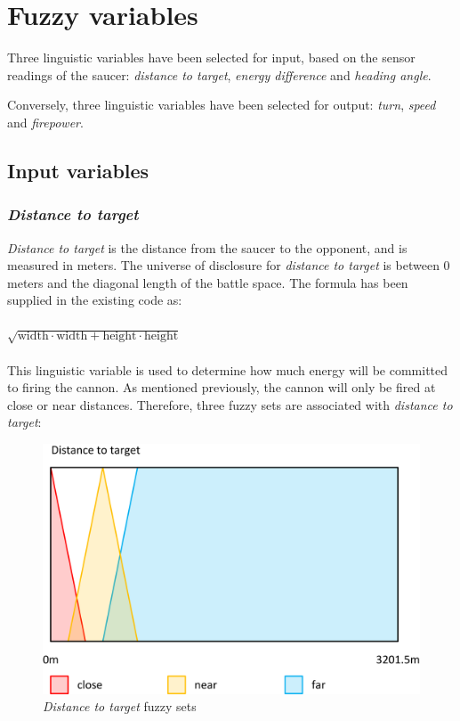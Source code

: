\newpage

\section{Fuzzy variables}

Three linguistic variables have been selected for input, based on the sensor readings of the saucer: \emph{distance to target}, \emph{energy difference} and \emph{heading angle}.

Conversely, three linguistic variables have been selected for output: \emph{turn}, \emph{speed} and \emph{firepower}.

\subsection{Input variables}

\subsubsection{\emph{Distance to target}}

\emph{Distance to target} is the distance from the saucer to the opponent, and is measured in meters. The universe of disclosure for \emph{distance to target} is between 0 meters and the diagonal length of the battle space. The formula has been supplied in the existing code as:
\\
\\
$\sqrt{\mbox{width} \cdot \mbox{width} + \mbox{height} \cdot \mbox{height}}$
\\
\\
This linguistic variable is used to determine how much energy will be committed to firing the cannon. As mentioned previously, the cannon will only be fired at close or near distances. Therefore, three fuzzy sets are associated with \emph{distance to target}:

\begin{figure}[H]
\centering
\caption{\emph{Distance to target} fuzzy sets}
\includegraphics[scale=0.1]{./img/pdf/distanceSets.pdf}
\end{figure}

